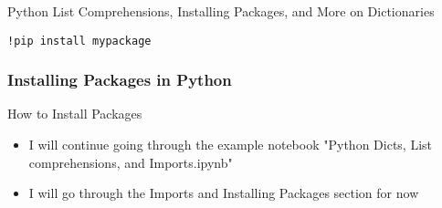 \documentclass[handout, 11pt]{beamer}
\begin{document}
\begin{section}{Python List Comprehensions, Installing Packages, and More on Dictionaries}
\begin{frame}
\begin{itemize}
\texttt{!pip install mypackage}
\end{itemize}
\end{frame}
\begin{frame}
\frametitle{Installing Packages in Python}
{
\begin{block}{How to Install Packages}
\begin{itemize}
\item I will continue going through the example notebook "Python Dicts, List comprehensions, and Imports.ipynb"
\item I will go through the Imports and Installing Packages section for now
\end{itemize}
\end{block}
}
\end{frame}
\end{section}
\end{document}
